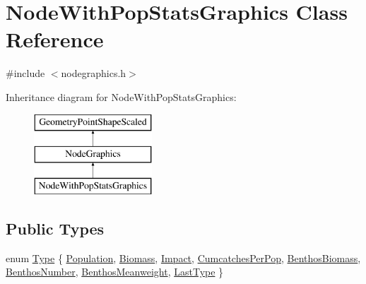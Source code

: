 \hypertarget{class_node_with_pop_stats_graphics}{}\section{Node\+With\+Pop\+Stats\+Graphics Class Reference}
\label{class_node_with_pop_stats_graphics}


{\ttfamily \#include $<$nodegraphics.\+h$>$}

Inheritance diagram for Node\+With\+Pop\+Stats\+Graphics\+:\begin{figure}[H]
\begin{center}
\leavevmode
\includegraphics[height=3.000000cm]{dd/d44/class_node_with_pop_stats_graphics}
\end{center}
\end{figure}
\subsection*{Public Types}
\begin{DoxyCompactItemize}
\item 
enum \mbox{\hyperlink{class_node_with_pop_stats_graphics_aeaa9e3e8bdb1f52ee13c0516413d33fe}{Type}} \{ \newline
\mbox{\hyperlink{class_node_with_pop_stats_graphics_aeaa9e3e8bdb1f52ee13c0516413d33fea46d1f69c41a3fdc85e64976ca3f9cb26}{Population}}, 
\mbox{\hyperlink{class_node_with_pop_stats_graphics_aeaa9e3e8bdb1f52ee13c0516413d33fead9c6b29eb93f0ad97f8ce9d5d742bf54}{Biomass}}, 
\mbox{\hyperlink{class_node_with_pop_stats_graphics_aeaa9e3e8bdb1f52ee13c0516413d33feaf73bb61c375cb0a39d8503457c16d17a}{Impact}}, 
\mbox{\hyperlink{class_node_with_pop_stats_graphics_aeaa9e3e8bdb1f52ee13c0516413d33fea48ccc241c36290550677d5c09426bb87}{Cumcatches\+Per\+Pop}}, 
\newline
\mbox{\hyperlink{class_node_with_pop_stats_graphics_aeaa9e3e8bdb1f52ee13c0516413d33fea2cda37f480c285d34c3be71fab8799c5}{Benthos\+Biomass}}, 
\mbox{\hyperlink{class_node_with_pop_stats_graphics_aeaa9e3e8bdb1f52ee13c0516413d33fea00c197eace3e88dbec43e402a6d8aed0}{Benthos\+Number}}, 
\mbox{\hyperlink{class_node_with_pop_stats_graphics_aeaa9e3e8bdb1f52ee13c0516413d33fea97b73f86240bd262ece3ac90a5aa37e4}{Benthos\+Meanweight}}, 
\mbox{\hyperlink{class_node_with_pop_stats_graphics_aeaa9e3e8bdb1f52ee13c0516413d33feab6a44af2dac041029b26a22dffb6e449}{Last\+Type}}
 \}
\end{DoxyCompactItemize}
